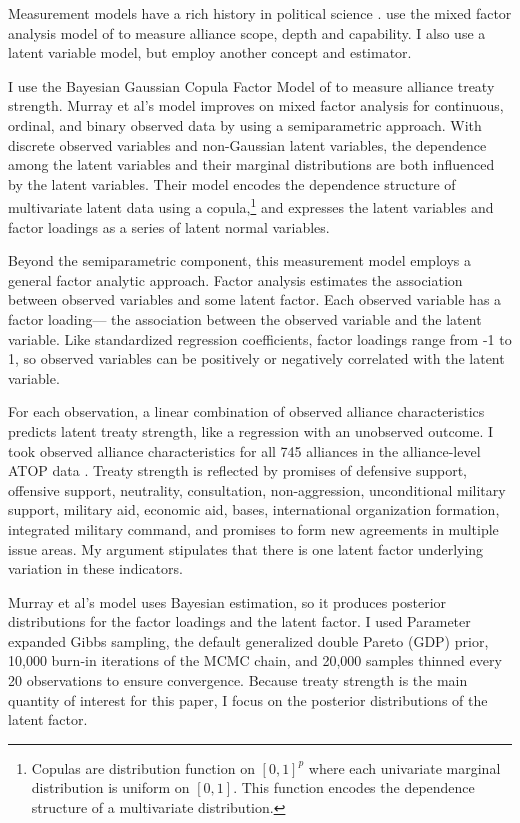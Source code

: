 \documentclass[12pt]{article}
\begin{document}
Measurement models have a rich history in political science \citep{Clintonetal2004, TreierJackman2008, Fariss2014}. 
\citet{BensonClinton2016} use the mixed factor analysis model of \citet{Quinn2004} to measure alliance scope, depth and capability.
I also use a latent variable model, but employ another concept and estimator. 


I use the Bayesian Gaussian Copula Factor Model of \citet{Murrayetal2013} to measure alliance treaty strength. 
Murray et al's model improves on mixed factor analysis for continuous, ordinal, and binary observed data by using a semiparametric approach. 
With discrete observed variables and non-Gaussian latent variables, the dependence among the latent variables and their marginal distributions are both influenced by the latent variables.
Their model encodes the dependence structure of multivariate latent data using a copula,\footnote{Copulas are distribution function on $[0, 1]^p$ where each univariate marginal distribution is uniform on $[0,1]$. This function encodes the dependence structure of a multivariate distribution.} and expresses the latent variables and factor loadings as a series of latent normal variables. 


Beyond the semiparametric component, this measurement model employs a general factor analytic approach.
Factor analysis estimates the association between observed variables and some latent factor.
Each observed variable has a factor loading--- the association between the observed variable and the latent variable.  
Like standardized regression coefficients, factor loadings range from -1 to 1, so observed variables can be positively or negatively correlated with the latent variable.  


For each observation, a linear combination of observed alliance characteristics predicts latent treaty strength, like a regression with an unobserved outcome.  
I took observed alliance characteristics for all 745 alliances in the alliance-level ATOP data \citep{Leedsetal2002}. 
Treaty strength is reflected by promises of defensive support, offensive support, neutrality, consultation, non-aggression, unconditional military support, military aid, economic aid, bases, international organization formation, integrated military command, and promises to form new agreements in multiple issue areas. 
My argument stipulates that there is one latent factor underlying variation in these indicators.


Murray et al's model uses Bayesian estimation, so it produces posterior distributions for the factor loadings and the latent factor. 
I used Parameter expanded Gibbs sampling, the default generalized double Pareto (GDP) prior, 10,000 burn-in iterations of the MCMC chain, and 20,000 samples thinned every 20 observations to ensure convergence. 
Because treaty strength is the main quantity of interest for this paper, I focus on the posterior distributions of the latent factor. 
\end{document}
